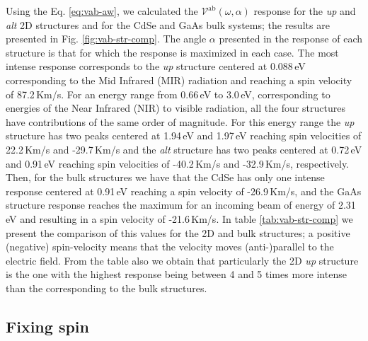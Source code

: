 \documentclass[prb,11pt,tightenlines,twocolumn,aps]{revtex4-1}
\begin{document}
Using the Eq. \eqref{eq:vab-aw}, we calculated the
$\mathcal{V}^{\mathrm{ab}}(\omega,\alpha)$ response for the \emph{up} and
\emph{alt} 2D structures and for the CdSe and GaAs bulk systems; the results
are presented in Fig. \ref{fig:vab-str-comp}. The angle $\alpha$ presented in
the response of each structure is that for which the response is maximized in
each case.
% 
The most intense response corresponds to the \emph{up} structure centered at
0.088\,eV corresponding to the Mid Infrared (MIR) radiation and reaching a spin
velocity of 87.2\,Km/s.
% 
For an energy range from 0.66\,eV to 3.0\,eV, corresponding
to energies of the Near Infrared (NIR) to visible radiation, all
the four structures have contributions of the same order of magnitude.
% 
For this energy range the \emph{up} structure has two peaks centered at
1.94\,eV and 1.97\,eV reaching spin velocities of 22.2\,Km/s and -29.7\,Km/s and the \emph{alt} structure has two peaks centered at 0.72\,eV
and 0.91\,eV reaching spin velocities of -40.2\,Km/s and -32.9\,Km/s,
respectively.
% 
Then, for the bulk structures we have that the CdSe has only one intense
response centered at 0.91\,eV reaching a spin velocity of -26.9\,Km/s, and the
GaAs structure response reaches the maximum for an incoming beam of energy of
2.31\,eV and resulting in a spin velocity of -21.6\,Km/s.
% 
In table \ref{tab:vab-str-comp} we present the comparison of this values for
the 2D and bulk structures; a positive (negative) spin-velocity means that the
velocity moves (anti-)parallel to the electric field.
% 
From the table also we obtain that particularly the 2D \emph{up} structure is
the one with the highest response being between 4 and 5 times more intense than
the corresponding to the bulk structures.




\subsection{Fixing spin} %
\label{sec:res-fixspin}


\end{document}
